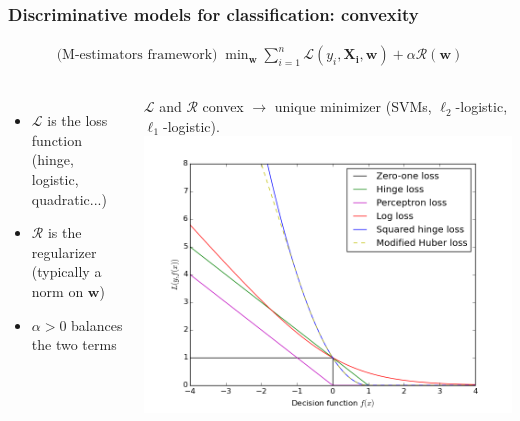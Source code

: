 \begin{frame}
\frametitle{Discriminative models for classification: convexity}
%
%
\begin{align*}
\text{(M-estimators framework)} \; \; \text{min}_{\mathbf{w}} \; \sum_{i=1}^n \mathcal{L}(y_i,\mathbf{X_i},\mathbf{w}) + \alpha \mathcal{R} (\mathbf{w})
\end{align*}
%
\begin{columns}[c]
\begin{itemize}
\item $\mathcal{L}$ is the loss function (hinge, logistic, quadratic...)
\item $\mathcal{R}$ is the regularizer (typically a norm on $\mathbf{w}$)
\item $\alpha > 0$ balances the two terms
\end{itemize}
$\mathcal{L}$ and $\mathcal{R}$ convex $\rightarrow$ unique minimizer (SVMs, $\ell_2$-logistic, $\ell_1$-logistic).
\includegraphics[width=1.2\textwidth]{sklearn_material/plot_sgd_loss_functions_001.png}
\end{columns}
\end{frame}


